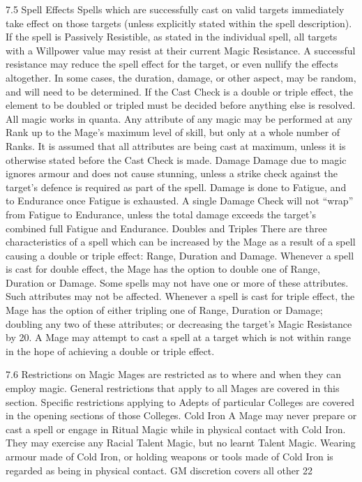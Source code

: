 \documentclass[a4paper]{article}
\begin{document}
\begin{multicols}{3}
7.5 Spell Effects
Spells which are successfully cast on valid targets
immediately take effect on those targets (unless
explicitly stated within the spell description). If the
spell is Passively Resistible, as stated in the individual spell, all targets with a Willpower value
may resist at their current Magic Resistance. A
successful resistance may reduce the spell effect
for the target, or even nullify the effects altogether.
In some cases, the duration, damage, or other aspect, may be random, and will need to be determined. If the Cast Check is a double or triple effect, the element to be doubled or tripled must be
decided before anything else is resolved.
All magic works in quanta. Any attribute of any
magic may be performed at any Rank up to the
Mage’s maximum level of skill, but only at a
whole number of Ranks. It is assumed that all
attributes are being cast at maximum, unless it is
otherwise stated before the Cast Check is made.
Damage
Damage due to magic ignores armour and does not
cause stunning, unless a strike check against the
target’s defence is required as part of the spell.
Damage is done to Fatigue, and to Endurance once
Fatigue is exhausted. A single Damage Check will
not “wrap” from Fatigue to Endurance, unless the
total damage exceeds the target’s combined full
Fatigue and Endurance.
Doubles and Triples
There are three characteristics of a spell which can
be increased by the Mage as a result of a spell
causing a double or triple effect: Range, Duration
and Damage.
Whenever a spell is cast for double effect, the
Mage has the option to double one of Range, Duration or Damage. Some spells may not have one or
more of these attributes. Such attributes may not be
affected.
Whenever a spell is cast for triple effect, the Mage
has the option of either tripling one of Range,
Duration or Damage; doubling any two of these
attributes; or decreasing the target’s Magic Resistance by 20.
A Mage may attempt to cast a spell at a target
which is not within range in the hope of achieving
a double or triple effect.

7.6 Restrictions on Magic
Mages are restricted as to where and when they can
employ magic. General restrictions that apply to all
Mages are covered in this section. Specific restrictions applying to Adepts of particular Colleges are
covered in the opening sections of those Colleges.
Cold Iron
A Mage may never prepare or cast a spell or engage in Ritual Magic while in physical contact with
Cold Iron. They may exercise any Racial Talent
Magic, but no learnt Talent Magic. Wearing armour made of Cold Iron, or holding weapons or
tools made of Cold Iron is regarded as being in
physical contact. GM discretion covers all other
22


\end{multicols}
\end{document}
